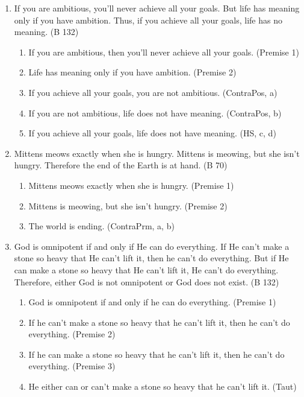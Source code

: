 \documentclass{article}
\begin{document}
\begin{enumerate}
\begin{enumerate}
          \end{enumerate}
    \item If you are ambitious, you'll never achieve all your goals. But life has meaning only if you have ambition. Thus, if you achieve all your goals, life has no meaning. (B 132)
          \begin{enumerate}
              \item If you are ambitious, then you'll never achieve all your goals. (Premise 1)
              \item Life has meaning only if you have ambition. (Premise 2)
              \item If you achieve all your goals, you are not ambitious. (ContraPos, a)
              \item If you are not ambitious, life does not have meaning. (ContraPos, b)
              \item If you achieve all your goals, life does not have meaning. (HS, c, d)
          \end{enumerate}
    \item Mittens meows exactly when she is hungry. Mittens is meowing, but she isn't hungry. Therefore the end of the Earth is at hand. (B 70)
          \begin{enumerate}
              \item Mittens meows exactly when she is hungry. (Premise 1)
              \item Mittens is meowing, but she isn't hungry. (Premise 2)
              \item The world is ending. (ContraPrm, a, b)
          \end{enumerate}
    \item God is omnipotent if and only if He can do everything. If He can't make a stone so heavy that He can't lift it, then he can't do everything. But if He can make a stone so heavy that He can't lift it, He can't do everything. Therefore, either God is not omnipotent or God does not exist. (B 132)
          \begin{enumerate}
              \item God is omnipotent if and only if he can do everything. (Premise 1)
              \item If he can't make a stone so heavy that he can't lift it, then he can't do everything. (Premise 2)
              \item If he can make a stone so heavy that he can't lift it, then he can't do everything. (Premise 3)
              \item He either can or can't make a stone so heavy that he can't lift it. (Taut)

\end{enumerate}
\end{enumerate}
\end{document}
